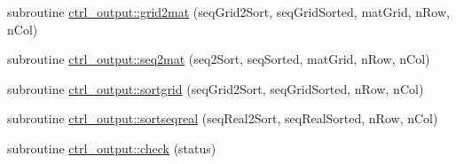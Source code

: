 \begin{DoxyCompactItemize}
\item 
subroutine \hyperlink{namespacectrl__output_a7c804abccd932d50e4938262f22f586e}{ctrl\+\_\+output\+::grid2mat} (seq\+Grid2\+Sort, seq\+Grid\+Sorted, mat\+Grid, n\+Row, n\+Col)
\item 
subroutine \hyperlink{namespacectrl__output_a06abc3039b8c610cb65b9cd42817d064}{ctrl\+\_\+output\+::seq2mat} (seq2\+Sort, seq\+Sorted, mat\+Grid, n\+Row, n\+Col)
\item 
subroutine \hyperlink{namespacectrl__output_a1807dd1d886e5fd090461e140156758b}{ctrl\+\_\+output\+::sortgrid} (seq\+Grid2\+Sort, seq\+Grid\+Sorted, n\+Row, n\+Col)
\item 
subroutine \hyperlink{namespacectrl__output_a093211a59ed2a27d1d853afc548146df}{ctrl\+\_\+output\+::sortseqreal} (seq\+Real2\+Sort, seq\+Real\+Sorted, n\+Row, n\+Col)
\item 
subroutine \hyperlink{namespacectrl__output_a0fbef481d73d1ca11f59121aadf9cb87}{ctrl\+\_\+output\+::check} (status)
\end{DoxyCompactItemize}
